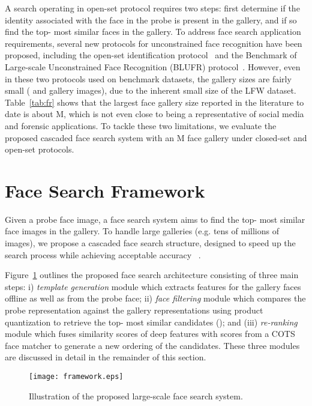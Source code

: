 \documentclass[10pt,journal,compsoc]{IEEEtran}
\begin{document}
A search operating in open-set protocol requires two steps: first determine if the identity associated with the face in the probe is present in the gallery, and if so find the top- most similar faces in the gallery. To address face search application requirements, several new protocols for unconstrained face recognition have been proposed, including the open-set identification protocol~\cite{faceretrieval:fusion} and the Benchmark of Large-scale Unconstrained Face Recognition (BLUFR) protocol~\cite{BLUFR}. However, even in these two protocols used on benchmark datasets, the gallery sizes are fairly small ( and  gallery images), due to the inherent small size of the LFW dataset. Table~\ref{tab:fr} shows that the largest face gallery size reported in the literature to date is about M, which is not even close to being a representative of social media and forensic applications. To tackle these two limitations, we evaluate the proposed cascaded face search system with an M face gallery under closed-set and open-set protocols.

\section{Face Search Framework}
Given a probe face image, a face search system aims to find the top- most similar face images in the gallery. To handle large galleries (e.g. tens of millions of images), we propose a cascaded face search structure, designed to speed up the search process while achieving acceptable accuracy ~\cite{Zhou19941539, fr:fastmatching}.

Figure~\ref{fig:framework} outlines the proposed face search architecture consisting of three main steps: i) \emph{template generation} module which extracts features for the  gallery faces offline as well as from the probe face; ii) \emph{face filtering} module which compares the probe representation against the gallery representations using product quantization to retrieve the top- most similar candidates (); and (iii) \emph{re-ranking} module which fuses similarity scores of deep features with scores from a COTS face matcher to generate a new ordering of the  candidates. These three modules are discussed in detail in the remainder of this section.
\begin{figure}[htpb]
  \centering
  \texttt{[image: framework.eps]}\\
  \caption{Illustration of the proposed large-scale face search system.}\label{fig:framework}
\end{figure}
\end{document}
